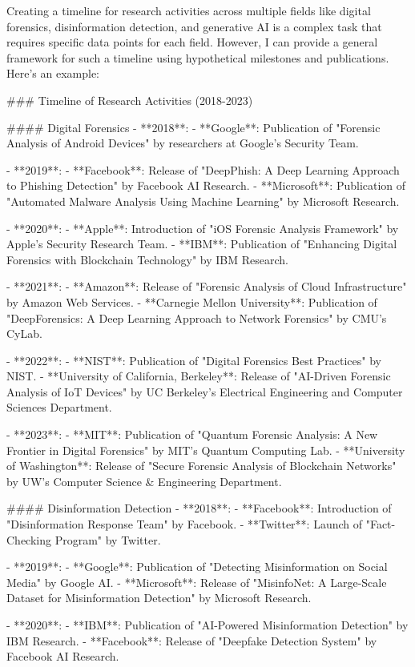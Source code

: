 Creating a timeline for research activities across multiple fields like digital forensics, disinformation detection, and generative AI is a complex task that requires specific data points for each field. However, I can provide a general framework for such a timeline using hypothetical milestones and publications. Here's an example:

### Timeline of Research Activities (2018-2023)

#### Digital Forensics
- **2018**: 
  - **Google**: Publication of "Forensic Analysis of Android Devices" by researchers at Google's Security Team.
  
- **2019**:
  - **Facebook**: Release of "DeepPhish: A Deep Learning Approach to Phishing Detection" by Facebook AI Research.
  - **Microsoft**: Publication of "Automated Malware Analysis Using Machine Learning" by Microsoft Research.

- **2020**:
  - **Apple**: Introduction of "iOS Forensic Analysis Framework" by Apple's Security Research Team.
  - **IBM**: Publication of "Enhancing Digital Forensics with Blockchain Technology" by IBM Research.

- **2021**:
  - **Amazon**: Release of "Forensic Analysis of Cloud Infrastructure" by Amazon Web Services.
  - **Carnegie Mellon University**: Publication of "DeepForensics: A Deep Learning Approach to Network Forensics" by CMU's CyLab.

- **2022**:
  - **NIST**: Publication of "Digital Forensics Best Practices" by NIST.
  - **University of California, Berkeley**: Release of "AI-Driven Forensic Analysis of IoT Devices" by UC Berkeley's Electrical Engineering and Computer Sciences Department.

- **2023**:
  - **MIT**: Publication of "Quantum Forensic Analysis: A New Frontier in Digital Forensics" by MIT's Quantum Computing Lab.
  - **University of Washington**: Release of "Secure Forensic Analysis of Blockchain Networks" by UW's Computer Science & Engineering Department.

#### Disinformation Detection
- **2018**:
  - **Facebook**: Introduction of "Disinformation Response Team" by Facebook.
  - **Twitter**: Launch of "Fact-Checking Program" by Twitter.

- **2019**:
  - **Google**: Publication of "Detecting Misinformation on Social Media" by Google AI.
  - **Microsoft**: Release of "MisinfoNet: A Large-Scale Dataset for Misinformation Detection" by Microsoft Research.

- **2020**:
  - **IBM**: Publication of "AI-Powered Misinformation Detection" by IBM Research.
  - **Facebook**: Release of "Deepfake Detection System" by Facebook AI Research.

